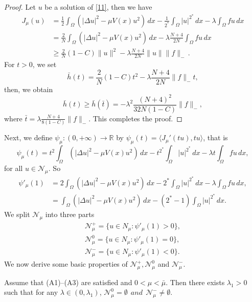 \documentclass[reqno]{amsart}
\begin{document}
\begin{proof}
 Let \(u\) be a solution of \eqref{11}, then we have
\begin{align*}
J_\mu (u)
&=\frac{1}{2}\int_{\Omega}(|\Delta u|^2-\mu V(x)u^2)\,dx-\frac{1}{2^*} \int_{\Omega} |u|^{2^*}\,dx-\lambda \int_{\Omega} fu\,dx\\
&=\frac{2}{N}\int_{\Omega}(|\Delta u|^2-\mu V(x)u^2)\,dx-\lambda\frac{N+4}{2N} \int_{\Omega} fu\,dx\\
&\geq \frac{2}{N}(1-C)\|u\|^2-\lambda \frac{N+4}{2N}\|u\|\|f\|_-\,.
\end{align*}
 For \(t>0\), we set
 \[
 \bar{h}(t)= \frac{2}{N}(1-C)t^2-\lambda \frac{N+4}{2N}\|f\|_-t,
 \]
 then, we obtain
\[
 \bar{h}(t)\geq \bar{h}(\bar{t})=-\lambda^2\frac{(N+4)^2}{32N(1-C)}\|f\|_-,
\]
where
 \(\bar {t}=\lambda \frac{N+4}{8(1-C)}\|f\|_-\). This completes the proof.
\end{proof}

 Next, we define \(\psi _\mu: (0, +\infty)\to \mathbb{R}\) by 
 \(\psi _\mu(t)=\langle J_{\mu}'(tu), tu\rangle\), that is
\[
 \psi _\mu(t)= t^2\int_{\Omega}(|\Delta u|^2-\mu V(x)u^2)\,dx-t^{2^*} \int_{\Omega}|u|^{2^*}\,dx-\lambda t \int_{\Omega}fu\,dx,
\]
for all \(u\in \mathcal{N}_\mu\). So
\begin{align*}
 \psi' _\mu(1) 
 &=2 \int_{\Omega}\left( |\Delta u|^2-\mu V(x)u^2\right)\,dx - 2^*\int_{\Omega}|u|^{2^*}\,dx -\lambda \int_{\Omega}fu\,dx, \\ \label{1}
 &=\int_{\Omega}\left( |\Delta u|^2-\mu V(x)u^2\right)\,dx -(2^*-1)\int_{\Omega}|u|^{2^*}\,dx.
\end{align*}
We split \(\mathcal{N}_\mu\) into three parts
\begin{gather*}
 \mathcal{N}_\mu^+= \{u\in N_\mu: \psi' _\mu(1) >0\},\\
\mathcal{N}_\mu^0= \{u\in N_\mu: \psi' _\mu(1) =0\}, \\
 \mathcal{N}_\mu^-= \{u\in N_\mu: \psi' _\mu(1)<0\}. 
\end{gather*}
We now derive some basic properties of \(\mathcal{N}_\mu^+, \mathcal{N}_\mu^0\) and 
\(\mathcal{N}_\mu^-\).

\begin{lemma}\label{l2}
Assume that {\rm (A1)--(A3)} are satisfied and \(0<\mu<\bar{\mu}\). 
Then there exists \(\lambda_1>0\) such that for any \(\lambda \in (0,\lambda_1)\), 
\(\mathcal{N}_\mu^0=\emptyset \ \ and \ \ \mathcal{N}_\mu^- \neq\emptyset\).
\end{lemma}
\end{document}
